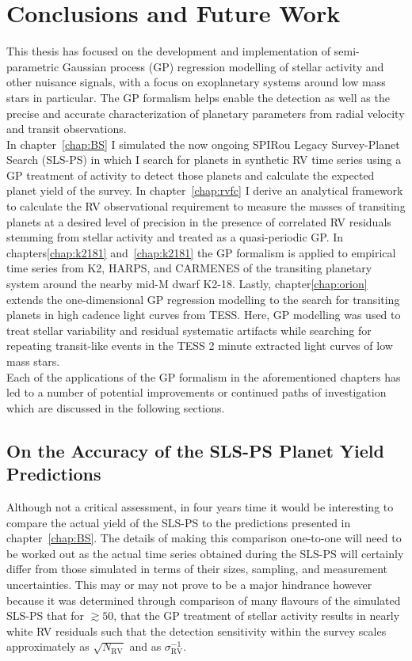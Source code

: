 \chapter{Conclusions and Future Work}

This thesis has focused on the development and implementation of
semi-parametric Gaussian process (GP) regression modelling of stellar activity
and other nuisance signals, with a focus on exoplanetary systems around low mass
stars in particular. The GP formalism helps enable the detection as
well as the precise and accurate characterization of planetary parameters
from radial velocity and transit observations. \\

In chapter~\ref{chap:BS} I simulated the
now ongoing SPIRou Legacy Survey-Planet Search (SLS-PS)
in which I search for planets
in synthetic RV time series using a GP treatment of activity to detect
those planets and calculate the expected planet yield of the survey. In
chapter~\ref{chap:rvfc} I derive an analytical framework to calculate the
RV observational requirement to measure the masses of transiting planets at
a desired level of precision in the presence of correlated RV residuals stemming
from stellar activity and treated as a quasi-periodic GP.
In chapters\ref{chap:k2181} and~\ref{chap:k2181} the GP formalism is
applied to empirical time series from K2, HARPS, and CARMENES of the transiting
planetary system around the nearby mid-M dwarf K2-18. Lastly,
chapter\ref{chap:orion} extends the one-dimensional GP regression modelling to
the search for transiting planets in high cadence light curves from TESS. Here,
GP modelling was used to treat stellar variability and residual systematic
artifacts while searching for repeating transit-like events in the TESS 2 minute
extracted light curves of low mass stars. \\

Each of the applications of the GP formalism in the aforementioned chapters
has led to a number of potential improvements or continued paths of investigation
which are discussed in the following sections.

\section{On the Accuracy of the SLS-PS Planet Yield Predictions}
Although not a critical assessment, in four years time it would be interesting
to compare the actual yield of the SLS-PS to the predictions presented in
chapter~\ref{chap:BS}. The details of making this comparison one-to-one will
need to be worked out as the actual time series obtained during the SLS-PS will
certainly differ from those simulated in terms of their sizes, sampling, and
measurement uncertainties. This may or may not prove to be a major hindrance
however because it was determined through comparison of many flavours of the
simulated SLS-PS that for \nrv{} $\gtrsim 50$, that the GP treatment of stellar
activity results in nearly white RV residuals such that the detection
sensitivity within the survey scales approximately as $\sqrt{N_{\text{RV}}}$ and
as $\sigma_{\text{RV}}^{-1}$. \\

